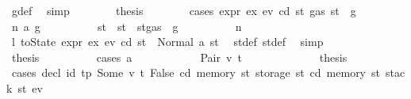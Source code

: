 \begin{isabellebody}
\ g{\isacharunderscore}{\kern0pt}def\ \isamarkupfalse%
\ simp\isanewline
\ \ \ \ \ \ \isamarkupfalse%
\ {\isacharquery}{\kern0pt}thesis\isanewline
\ \ \ \ \ \ \isamarkupfalse%
\ {\isacharparenleft}{\kern0pt}cases\ {\isachardoublequoteopen}expr\ ex{\isacharprime}{\kern0pt}\ e\isactrlsub v\ cd\ st{\isacharprime}{\kern0pt}\ {\isacharparenleft}{\kern0pt}gas\ st\ {\isacharminus}{\kern0pt}\ g{\isacharparenright}{\kern0pt}{\isachardoublequoteclose}{\isacharparenright}{\kern0pt}\isanewline
\ \ \ \ \ \ \ \ \isamarkupfalse%
\ {\isacharparenleft}{\kern0pt}n\ a\ g{\isacharprime}{\kern0pt}{\isacharparenright}{\kern0pt}\isanewline
\ \ \ \ \ \ \ \ \isamarkupfalse%
\ st{\isacharprime}{\kern0pt}{\isacharprime}{\kern0pt}\ \ {\isachardoublequoteopen}st{\isacharprime}{\kern0pt}{\isacharprime}{\kern0pt}\ {\isacharequal}{\kern0pt}\ st{\isacharprime}{\kern0pt}{\isasymlparr}gas\ {\isacharcolon}{\kern0pt}{\isacharequal}{\kern0pt}\ g{\isacharprime}{\kern0pt}{\isasymrparr}{\isachardoublequoteclose}\isanewline
\ \ \ \ \ \ \ \ \isamarkupfalse%
\ n\ \isamarkupfalse%
\ l{}{\isacharcolon}{\kern0pt}\ {\isachardoublequoteopen}toState\ {\isacharparenleft}{\kern0pt}expr\ ex{\isacharprime}{\kern0pt}\ e\isactrlsub v\ cd{\isacharparenright}{\kern0pt}\ st{\isacharprime}{\kern0pt}\ {\isacharequal}{\kern0pt}\ Normal\ {\isacharparenleft}{\kern0pt}a{\isacharcomma}{\kern0pt}\ st{\isacharprime}{\kern0pt}{\isacharprime}{\kern0pt}{\isacharparenright}{\kern0pt}{\isachardoublequoteclose}\ \isamarkupfalse%
\ st{\isacharprime}{\kern0pt}{\isacharprime}{\kern0pt}{\isacharunderscore}{\kern0pt}def\ st{\isacharprime}{\kern0pt}{\isacharunderscore}{\kern0pt}def\ \isamarkupfalse%
\ simp\isanewline
\ \ \ \ \ \ \ \ \isamarkupfalse%
\ \isamarkupfalse%
\ {\isacharquery}{\kern0pt}thesis\isanewline
\ \ \ \ \ \ \ \ \isamarkupfalse%
\ {\isacharparenleft}{\kern0pt}cases\ a{\isacharparenright}{\kern0pt}\isanewline
\ \ \ \ \ \ \ \ \ \ \isamarkupfalse%
\ {\isacharparenleft}{\kern0pt}Pair\ v\ t{\isacharparenright}{\kern0pt}\isanewline
\ \ \ \ \ \ \ \ \ \ \isamarkupfalse%
\ \isamarkupfalse%
\ {\isacharquery}{\kern0pt}thesis\isanewline
\ \ \ \ \ \ \ \ \ \ \isamarkupfalse%
\ {\isacharparenleft}{\kern0pt}cases\ {\isachardoublequoteopen}decl\ id{}\ tp\ {\isacharparenleft}{\kern0pt}Some\ {\isacharparenleft}{\kern0pt}v{\isacharcomma}{\kern0pt}\ t{\isacharparenright}{\kern0pt}{\isacharparenright}{\kern0pt}\ False\ cd\ {\isacharparenleft}{\kern0pt}memory\ st{\isacharprime}{\kern0pt}{\isacharprime}{\kern0pt}{\isacharparenright}{\kern0pt}\ {\isacharparenleft}{\kern0pt}storage\ st{\isacharprime}{\kern0pt}{\isacharprime}{\kern0pt}{\isacharparenright}{\kern0pt}\ {\isacharparenleft}{\kern0pt}cd{\isacharcomma}{\kern0pt}\ memory\ st{\isacharprime}{\kern0pt}{\isacharprime}{\kern0pt}{\isacharcomma}{\kern0pt}\ stack\ st{\isacharprime}{\kern0pt}{\isacharprime}{\kern0pt}{\isacharcomma}{\kern0pt}\ e\isactrlsub v{\isacharparenright}{\kern0pt}{\isachardoublequoteclose}{\isacharparenright}{\kern0pt}\isanewline

\end{isabellebody}
